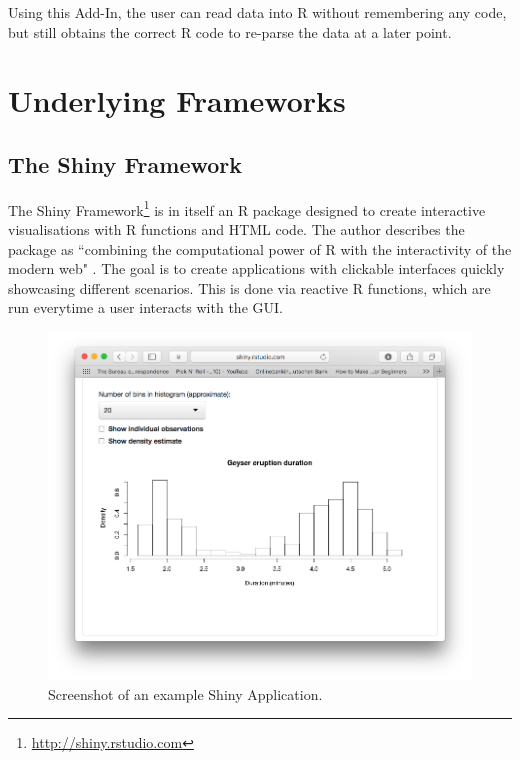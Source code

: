 \documentclass[12pt]{article} %
\begin{document}
Using this Add-In, the user can read data into R without remembering any code, but still obtains the correct R code to re-parse the data at a later point. 

\section{Underlying Frameworks}

\subsection{The Shiny Framework}

The Shiny Framework\footnote{\url{http://shiny.rstudio.com}} is in itself an R package designed to create interactive visualisations with R functions and HTML code. The author describes the package as ``combining the computational power of R with the interactivity of the modern web" \cite[RStudio 2016]{w3}. The goal is to create applications with clickable interfaces quickly showcasing different scenarios. This is done via reactive R functions, which are run everytime a user interacts with the GUI. 

\begin{figure}[h]
\begin{centering}
\includegraphics[scale = 0.5, trim = 50 50 50 100]{figures/example_shiny_app.png}
\caption{Screenshot of an example Shiny Application.}
\label{exampleapp}
\end{centering}
\end{figure}
\end{document}
